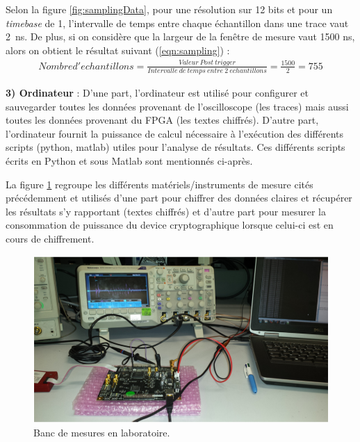 \documentclass[oneside]{book}
\begin{document}
\hspace{-0.5cm}Selon la figure \ref{fig:samplingData}, pour une résolution sur 12 bits et pour un \textit{timebase} de 1, l'intervalle de temps entre chaque échantillon dans une trace vaut \SI{2}{\nano\second}. De plus, si on considère que la largeur de la fenêtre de mesure vaut 1500 ns, alors on obtient le résultat suivant (\ref{eqn:sampling}) : 
\begin{gather}
	 Nombre d'echantillons = \frac{Valeur \ Post \ trigger}{Intervalle \ de \ temps \ entre \ 2 \ echantillons} = \frac{1500}{2} = 755 \label{eqn:sampling}
\end{gather}

\hspace{-0.5cm}\textbf{3) Ordinateur} : D'une part, l'ordinateur est utilisé pour configurer et sauvegarder toutes les données provenant de l'oscilloscope (les traces) mais aussi toutes les données provenant du FPGA (les textes chiffrés). D'autre part, l'ordinateur fournit la puissance de calcul nécessaire à l'exécution des différents scripts (python, matlab) utiles pour l'analyse de résultats. Ces différents scripts écrits en Python et sous Matlab sont mentionnés ci-après.

\newpage

\hspace{-0.5cm}La figure \ref{fig:matos} regroupe les différents matériels/instruments de mesure cités précédemment et utilisés d'une part pour chiffrer des données claires et récupérer les résultats s'y rapportant (textes chiffrés) et d'autre part pour mesurer la consommation de puissance du device cryptographique lorsque celui-ci est en cours de chiffrement.
\begin{figure}[htbp]
    \centering
    \includegraphics[scale=0.35]{image/matos}
    \caption{Banc de mesures en laboratoire.}
    \label{fig:matos} 
\end{figure}
\end{document}
